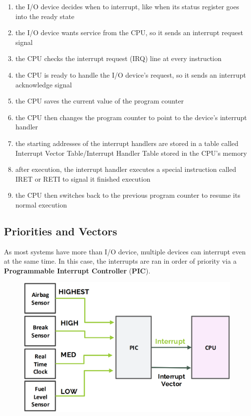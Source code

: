 \begin{enumerate}
    \item the I/O device decides when to interrupt, like when its status register goes into the ready state
    \item the I/O device wants service from the CPU, so it sends an interrupt request signal
    \item the CPU checks the interrupt request (IRQ) line at every instruction
    \item the CPU is ready to handle the I/O device's request, so it sends an interrupt acknowledge signal
    \item the CPU saves the current value of the program counter
    \item the CPU then changes the program counter to point to the device's interrupt handler
    \item the starting addresses of the interrupt handlers are stored in a table called Interrupt Vector Table/Interrupt Handler Table stored in the CPU's memory
    \item after execution, the interrupt handler executes a special instruction called IRET or RETI to signal it finished execution
    \item the CPU then switches back to the previous program counter to resume its normal execution
\end{enumerate}

\subsection{Priorities and Vectors}

As most systems have more than I/O device, multiple devices can interrupt even at the same time. In this
case, the interrupts are ran in order of priority via a \textbf{Programmable Interrupt Controller} (\textbf{PIC}).

\begin{figure}[H]
    \centering
    \includegraphics[width=0.65\linewidth]{img/image46.png}
\end{figure}

